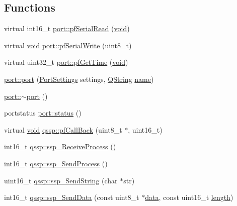 \subsection*{Functions}
\begin{DoxyCompactItemize}
\item 
virtual int16\-\_\-t \hyperlink{group___uploader_gadd5058c032731db789a6939d946b8488}{port\-::pf\-Serial\-Read} (\hyperlink{group___u_a_v_objects_plugin_ga444cf2ff3f0ecbe028adce838d373f5c}{void})
\item 
virtual \hyperlink{group___u_a_v_objects_plugin_ga444cf2ff3f0ecbe028adce838d373f5c}{void} \hyperlink{group___uploader_gacf5dd3d2c9621fe585631102008d1230}{port\-::pf\-Serial\-Write} (uint8\-\_\-t)
\item 
virtual uint32\-\_\-t \hyperlink{group___uploader_ga32f898399d197f0ffd28f7a09677bc9b}{port\-::pf\-Get\-Time} (\hyperlink{group___u_a_v_objects_plugin_ga444cf2ff3f0ecbe028adce838d373f5c}{void})
\item 
\hyperlink{group___uploader_ga07c31ea30e7226e74f05a64bf51e89c8}{port\-::port} (\hyperlink{struct_port_settings}{Port\-Settings} settings, \hyperlink{group___u_a_v_objects_plugin_gab9d252f49c333c94a72f97ce3105a32d}{Q\-String} \hyperlink{glext_8h_ad977737dfc9a274a62741b9500c49a32}{name})
\item 
\hyperlink{group___uploader_gacd903c84068e3b7829d0688ae4aad58e}{port\-::$\sim$port} ()
\item 
portstatus \hyperlink{group___uploader_gad6f230ba369433c2d5c0aefe3b337853}{port\-::status} ()
\item 
virtual \hyperlink{group___u_a_v_objects_plugin_ga444cf2ff3f0ecbe028adce838d373f5c}{void} \hyperlink{group___uploader_ga28dc454e607c69686bf4df989ad3d1ae}{qssp\-::pf\-Call\-Back} (uint8\-\_\-t $\ast$, uint16\-\_\-t)
\item 
int16\-\_\-t \hyperlink{group___uploader_ga11e7402dcc0d8efde83d13592279f122}{qssp\-::ssp\-\_\-\-Receive\-Process} ()
\item 
int16\-\_\-t \hyperlink{group___uploader_gaa1b44e385ddf057c81585809dc71e4ba}{qssp\-::ssp\-\_\-\-Send\-Process} ()
\item 
uint16\-\_\-t \hyperlink{group___uploader_ga53a085c64c9a0e54a10cefe2ce660714}{qssp\-::ssp\-\_\-\-Send\-String} (char $\ast$str)
\item 
int16\-\_\-t \hyperlink{group___uploader_gae129d1cdf9ba386b6cd8002176a35a3b}{qssp\-::ssp\-\_\-\-Send\-Data} (const uint8\-\_\-t $\ast$\hyperlink{glext_8h_a8850df0785e6fbcc2351af3b686b8c7a}{data}, const uint16\-\_\-t \hyperlink{glext_8h_a3c8469415bbc83dd1341af15c67f1cef}{length})

\end{DoxyCompactItemize}
